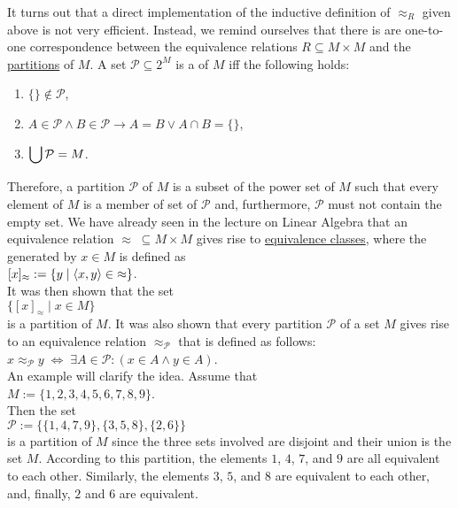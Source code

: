 It turns out that a direct implementation of the inductive definition of $\approx_R$ given above is
not very efficient.  Instead, we remind ourselves that there is are one-to-one correspondence
between the equivalence relations $R \subseteq M \times M$ and the
\href{https://en.wikipedia.org/wiki/Partition_of_a_set}{partitions} of $M$.  A set 
$\mathcal{P} \subseteq 2^M$ is a  of $M$ iff the following holds:
\begin{enumerate}
\item $\{\} \not\in \mathcal{P}$,
\item $A \in \mathcal{P} \wedge B \in \mathcal{P} \rightarrow A = B \vee A \cap B = \{\}$,
\item $\displaystyle\bigcup \mathcal{P} = M$.
\end{enumerate}
Therefore, a partition $\mathcal{P}$ of $M$ is a subset of the power set of $M$ such that
every element of $M$ is a member of  set of $\mathcal{P}$ and, furthermore, $\mathcal{P}$ must not contain the
empty set.  We have already seen in the lecture on Linear Algebra that an equivalence relation 
$\approx \;\subseteq M \times M$ gives rise to
\href{https://en.wikipedia.org/wiki/Equivalence_class}{equivalence classes}, 
where the  generated by $x \in M$ is defined as
\\[0.2cm]
\hspace*{1.3cm}
$[x]_\approx := \{ y \mid \pair(x, y) \in\; \approx \}$.
\\[0.2cm]
It was then shown that the set 
\\[0.2cm]
\hspace*{1.3cm}
$\bigl\{ [x]_\approx \;\big|\; x \in M \bigr\}$
\\[0.2cm]
is a partition of $M$.  It was also shown that every partition $\mathcal{P}$ of a set $M$ gives rise
to an equivalence relation $\approx_\mathcal{P}$ that is defined as follows:
\\[0.2cm]
\hspace*{1.3cm}
$x \approx_\mathcal{P} y \;\Longleftrightarrow\; \exists A \in \mathcal{P}:(x \in A \wedge y \in A)$.
\\[0.2cm]
An example will clarify the idea.  Assume that
\\[0.2cm]
\hspace*{1.3cm}
$M := \{ 1,2,3,4,5,6,7,8,9 \}$.
\\[0.2cm]
Then the set 
\\[0.2cm]
\hspace*{1.3cm}
$\mathcal{P} := \bigl\{ \{ 1, 4, 7, 9\}, \{3, 5, 8\}, \{2, 6\} \bigr\}$
\\[0.2cm]
is a partition of $M$ since the three sets involved are disjoint and their union is the set $M$.
According to this partition, the elements $1$, $4$, $7$, and $9$ are all
equivalent to each other.  Similarly, the elements $3$, $5$, and $8$ are equivalent to each other,
and, finally, $2$ and $6$ are equivalent.

